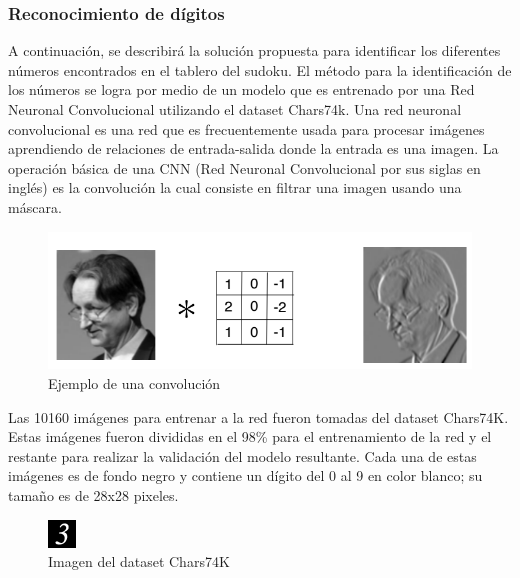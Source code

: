 \documentclass{article}
\begin{document}
\subsubsection{Reconocimiento de d\'igitos}
A continuaci\'on, se describir\'a la soluci\'on propuesta para identificar los diferentes n\'umeros encontrados en el tablero del sudoku.
El m\'etodo para la identificaci\'on de los n\'umeros se logra por medio de un modelo que es entrenado por una Red Neuronal Convolucional utilizando el dataset Chars74k. \break
Una red neuronal convolucional es una red que es frecuentemente usada para procesar im\'agenes aprendiendo de relaciones de entrada-salida donde la entrada es una imagen. La operaci\'on b\'asica de una CNN (Red Neuronal Convolucional por sus siglas en ingl\'es) es la convoluci\'on la cual consiste en filtrar una imagen usando una m\'ascara.
\begin{figure}[H]
  \caption{Ejemplo de una convoluci\'on}
  \centering
  \includegraphics[scale=.50]{convolution}
  \end{figure}

Las 10160 im\'agenes para entrenar a la red fueron tomadas del dataset Chars74K. Estas im\'agenes fueron divididas en el 98\% para el entrenamiento de la red y el restante para realizar la validaci\'on del modelo resultante. Cada una de estas im\'agenes es de fondo negro y contiene un d\'igito del 0 al 9 en color blanco; su tama\~no es de 28x28 pixeles.
\begin{figure}[H]
  \caption{Imagen del dataset Chars74K}
  \centering
  \includegraphics[]{dtimgexample}
\end{figure}
\end{document}
